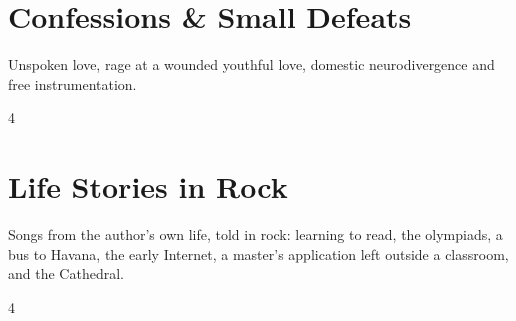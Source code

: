 \documentclass[a4paper,landscape]{memoir}
\begin{document}
\chapter{Confessions \& Small Defeats}
Unspoken love, rage at a wounded youthful love, domestic neurodivergence and free instrumentation.
\clearpage\begin{multicols*}{4}
\end{multicols*}

\chapter{Life Stories in Rock}
Songs from the author’s own life, told in rock: learning to read, the olympiads, a bus to Havana, the early Internet, a master’s application left outside a classroom, and the Cathedral.
\clearpage\begin{multicols*}{4}
\end{multicols*}
\end{document}
